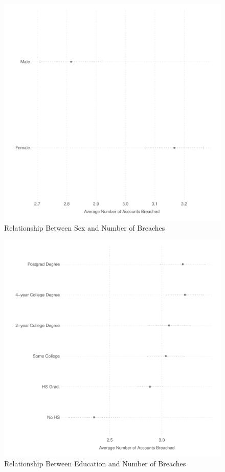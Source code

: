 \documentclass[12pt, letterpaper]{article}
\begin{document}
\begin{figure}[H]
  \centering
   \caption{Relationship Between Sex and Number of Breaches  
  \label{fig:sex_breaches}}
    \includegraphics[scale=.75]{../figs/sex_pwned.pdf}
\end{figure}
\clearpage

\begin{figure}[H]
  \centering
   \caption{Relationship Between Education and Number of Breaches 
  \label{fig:educ_breaches}}
    \includegraphics[scale=.75]{../figs/educ_pwned.pdf}
\end{figure}
\clearpage
\end{document}
